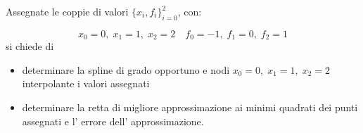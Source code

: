 Assegnate le coppie di valori $\{x_i,f_i \}_{i=0}^2$, con:

\[ x_0=0, \; x_1=1, \; x_2=2 \quad f_0=-1, \; f_1=0, \; f_2=1 \]
si chiede di
\begin{itemize}
\item determinare la spline di grado opportuno e
nodi $x_0=0, \; x_1=1, \; x_2=2$ interpolante i valori assegnati
\item determinare la retta di migliore approssimazione ai minimi quadrati dei punti assegnati
e l' errore dell' approssimazione.
\end{itemize}

